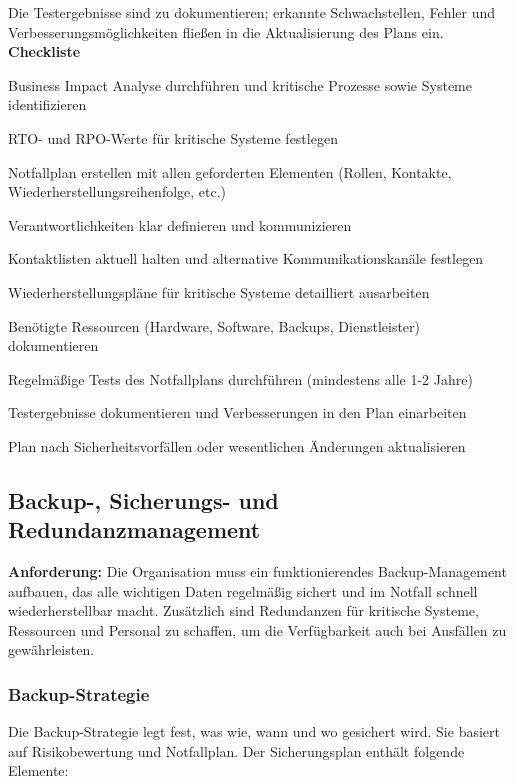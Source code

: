 Die Testergebnisse sind zu dokumentieren; erkannte Schwachstellen, Fehler und Verbesserungsmöglichkeiten fließen in die Aktualisierung des Plans ein.
\newpage
\textbf{Checkliste}
\begin{checklist}
    \item Business Impact Analyse durchführen und kritische Prozesse sowie Systeme identifizieren
    \item RTO- und RPO-Werte für kritische Systeme festlegen
    \item Notfallplan erstellen mit allen geforderten Elementen (Rollen, Kontakte, Wiederherstellungsreihenfolge, etc.)
    \item Verantwortlichkeiten klar definieren und kommunizieren
    \item Kontaktlisten aktuell halten und alternative Kommunikationskanäle festlegen
    \item Wiederherstellungspläne für kritische Systeme detailliert ausarbeiten
    \item Benötigte Ressourcen (Hardware, Software, Backups, Dienstleister) dokumentieren
    \item Regelmäßige Tests des Notfallplans durchführen (mindestens alle 1-2 Jahre)
    \item Testergebnisse dokumentieren und Verbesserungen in den Plan einarbeiten
    \item Plan nach Sicherheitsvorfällen oder wesentlichen Änderungen aktualisieren
\end{checklist}

\newpage
\subsection{Backup-, Sicherungs- und Redundanzmanagement}

\textbf{Anforderung:} Die Organisation muss ein funktionierendes Backup-Management aufbauen, das alle wichtigen Daten regelmäßig sichert und im Notfall schnell wiederherstellbar macht. Zusätzlich sind Redundanzen für kritische Systeme, Ressourcen und Personal zu schaffen, um die Verfügbarkeit auch bei Ausfällen zu gewährleisten.


\subsubsection{Backup-Strategie}
Die Backup-Strategie legt fest, was wie, wann und wo gesichert wird. Sie basiert auf Risikobewertung und Notfallplan. Der Sicherungsplan enthält folgende Elemente:

